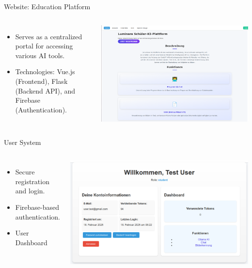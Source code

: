 \documentclass{beamer}
\begin{document}
\begin{frame}{Website: Education Platform}
  \begin{columns}
      \begin{itemize}
        \item Serves as a centralized portal for accessing various AI tools.
        \item Technologies: Vue.js (Frontend), Flask (Backend API), and Firebase (Authentication).
      \end{itemize}
      \centering
      \includegraphics[width=\textwidth]{homepage-screenshot.png}
  \end{columns}
\end{frame}

\begin{frame}{User System}
  \begin{columns}
      \begin{itemize}
        \item Secure registration and login.
        \item Firebase-based authentication.
        \item User Dashboard 
      \end{itemize}
      \centering
      \includegraphics[width=\textwidth]{Account-Managment.png}
  \end{columns}
\end{frame}
\end{document}
